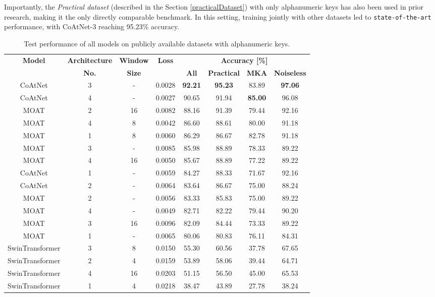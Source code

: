 \documentclass[a4paper,11pt,twoside]{report}
\theoremstyle{definition}
\begin{document}
Importantly, the \textit{Practical dataset} (described in the Section \ref{practicalDataset}) with only alphanumeric keys has also been used in prior research, making it the only directly comparable benchmark. In this setting, training jointly with other datasets led to \texttt{state-of-the-art} performance, with CoAtNet-3 reaching 95.23\% accuracy.


\begin{table}[h!]
\centering
\caption{Test performance of all models on publicly available datasets with alphanumeric keys.}
\begin{adjustbox}{max width=\textwidth}
\begin{tabular}{c|c|c|c|cccc}
\hline
\textbf{Model} & \textbf{Architecture} & \textbf{Window} & \textbf{Loss} & \multicolumn{4}{c}{\textbf{Accuracy [\%]}} \\
\cline{5-8}
       &   \textbf{No.}  &   \textbf{Size}   &   & \textbf{All} & \textbf{Practical} & \textbf{MKA} & \textbf{Noiseless}  \\
\hline
CoAtNet & 3 & - & 0.0028 & \textbf{92.21} & \textbf{95.23} & 83.89 & \textbf{97.06}  \\
CoAtNet & 4 & - & 0.0027 & 90.65 & 91.94 & \textbf{85.00} & 96.08  \\
MOAT & 2 & 16 & 0.0082 & 88.16 & 91.39 & 79.44 & 92.16  \\
MOAT & 4 & 8 & 0.0042 & 86.60 & 88.61 & 80.00 & 91.18  \\
MOAT & 1 & 8 & 0.0060 & 86.29 & 86.67 & 82.78 & 91.18  \\
MOAT & 3 & - & 0.0085 & 85.98 & 88.89 & 78.33 & 89.22  \\
MOAT & 4 & 16 & 0.0050 & 85.67 & 88.89 & 77.22 & 89.22  \\
CoAtNet & 1 & - & 0.0059 & 84.27 & 88.33 & 71.67 & 92.16  \\
CoAtNet & 2 & - & 0.0064 & 83.64 & 86.67 & 75.00 & 88.24  \\
MOAT & 2 & - & 0.0056 & 83.33 & 85.83 & 75.00 & 89.22  \\
MOAT & 4 & - & 0.0049 & 82.71 & 82.22 & 79.44 & 90.20  \\
MOAT & 3 & 16 & 0.0096 & 82.09 & 84.44 & 73.33 & 89.22  \\
MOAT & 1 & - & 0.0065 & 80.06 & 80.83 & 76.11 & 84.31  \\
SwinTransformer & 3 & 8 & 0.0150 & 55.30 & 60.56 & 37.78 & 67.65  \\
SwinTransformer & 2 & 4 & 0.0159 & 53.89 & 58.06 & 39.44 & 64.71  \\
SwinTransformer & 4 & 16 & 0.0203 & 51.15 & 56.50 & 45.00 & 65.53  \\
SwinTransformer & 1 & 4 & 0.0218 & 38.47 & 43.89 & 27.78 & 38.24  \\
\hline
\end{tabular}
\end{adjustbox}
\label{tab:alphanumeric_clean_results}
\end{table}
\end{document}
